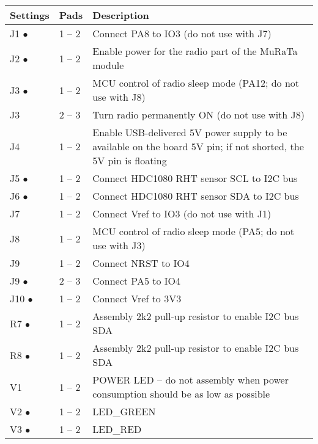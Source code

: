 \documentclass[twoside,a4paper]{refart}
\begin{document}
   \begin{table*}[!ht]
    \hspace*{-4cm}
    \begin{tabular}{| p{2cm} | p{1cm} | p{9cm} |}
        \hline
        \rowcolor{SeaGreen3!30!} {\bf Settings\footnotemark{}} & {\bf Pads} & {\bf Description} \\
        \hline
        \hline
        J1  \hfill $\bullet$ & 1 -- 2 & Connect PA8 to IO3 (do not use with J7)\\
        \hline
        J2  \hfill $\bullet$ & 1 -- 2 & Enable power for the radio part of the MuRaTa module\\
        \hline
        J3  \hfill $\bullet$ & 1 -- 2 & MCU control of radio sleep mode (PA12; do not use with J8)\\
        \hline
        J3                  & 2 -- 3 & Turn radio permanently ON (do not use with J8) \\
        \hline
        J4                  & 1 -- 2 & Enable USB-delivered 5V power supply to be available on the board 5V pin; if not shorted, the 5V pin is floating\\
        \hline
        J5  \hfill $\bullet$ & 1 -- 2& Connect HDC1080 RHT sensor SCL to I2C bus\\
        \hline
        J6  \hfill $\bullet$ & 1 -- 2& Connect HDC1080 RHT sensor SDA to I2C bus\\
        \hline
        J7                   & 1 -- 2 & Connect Vref to IO3 (do not use with J1)\\
        \hline
        J8                   & 1 -- 2 & MCU control of radio sleep mode (PA5; do not use with J3)\\
        \hline
        J9                   & 1 -- 2 & Connect NRST to IO4\\
        \hline
        J9  \hfill $\bullet$ & 2 -- 3 & Connect PA5 to IO4\\
        \hline
        J10 \hfill $\bullet$ & 1 -- 2 & Connect Vref to 3V3\\
        \hline
        R7  \hfill $\bullet$ & 1 -- 2& Assembly 2k2 pull-up resistor to enable I2C bus SDA\\
        \hline
        R8  \hfill $\bullet$ & 1 -- 2& Assembly 2k2 pull-up resistor to enable I2C bus SDA\\
        \hline
        V1                   & 1 -- 2& POWER LED -- do not assembly when power consumption should be as low as possible\\
        \hline
        V2  \hfill $\bullet$ & 1 -- 2&  LED\_GREEN \\
        \hline
        V3  \hfill $\bullet$ & 1 -- 2&  LED\_RED \\
        \hline
    \end{tabular}
    \label{tab:boards:MBP}
   \end{table*}
   
\end{document}

